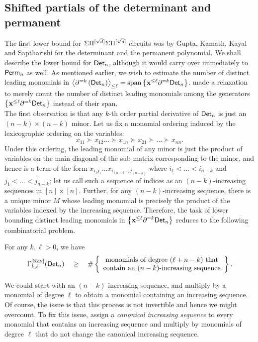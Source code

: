 \subsection{Shifted partials of the determinant and permanent}

The first lower bound for $\Sigma\Pi^{[\sqrt{d}]}\Sigma\Pi^{[\sqrt{d}]}$ circuits was by Gupta, Kamath, Kayal and Saptharishi \cite{gkks13} for the determinant and the permanent polynomial. We shall describe the lower bound for $\mathsf{Det}_n$, although it would carry over immediately to $\mathsf{Perm}_n$ as well. As mentioned earlier, we wish to estimate the number of distinct leading monomials in $\left\langle\partial^{=k}\left(\mathsf{Det}_n\right)\right\rangle_{\leq \ell} = \mathrm{span}\left\{\mathbf{x}^{\leq \ell}\partial^{=k}\mathsf{Det}_n\right\}$. \cite{gkks13} made a relaxation to merely count the number of distinct leading monomials among the generators $\left\{\mathbf{x}^{\leq \ell}\partial^{=k}\mathsf{Det}_n\right\}$ instead of their span. \\

The first observation is that any $k$-th order partial derivative of $\mathsf{Det}_n$ is just an $(n-k)\times (n-k)$ minor. Let us fix a monomial ordering induced by the lexicographic ordering on the variables:
$$
x_{11} \succ x_{12} \dots \succ x_{1n} \succ x_{21} \succ \dots \succ x_{nn}.
$$
Under this ordering, the leading monomial of any minor is just the product of variables on the main diagonal of the sub-matrix corresponding to the minor, and hence is a term of the form $x_{i_1j_1}\dots x_{i_{(n-k)},j_{(n-k)}}$ where $i_1 < \dots < i_{n-k}$ and $j_1 < \dots < j_{n-k}$; let us call such a sequence of indices as an $(n-k)$-increasing sequences in $[n]\times [n]$. Further, for any $(n-k)$-increasing sequence, there is a unique minor $M$ whose leading monomial is precisely the product of the variables indexed by the increasing sequence. Therefore, the task of lower bounding distinct leading monomials in $\left\{\mathbf{x}^{\leq \ell}\partial^{=k}\mathsf{Det}_n\right\}$ reduces to the following combinatorial problem.
\begin{claim} For any $k,\ell > 0$,  we have
$$
\Gamma^{\mathrm{[Kay]}}_{k,\ell}(\mathsf{Det}_n) \quad \geq \quad \#\left\{\begin{array}{cc}\text{monomials of degree $(\ell + n -k)$ that}\\\text{contain an $(n-k)$-increasing sequence}\end{array}\right\}.
$$
\end{claim}

We could start with an $(n-k)$-increasing sequence, and multiply by a monomial of degree $\ell$ to obtain a monomial containing an increasing sequence. Of course, the issue is that this process is not invertible and hence we might overcount. To fix this issue, \cite{gkks13} assign a \emph{canonical increasing sequence} to every monomial that contains an increasing sequence and multiply by monomials of degree $\ell$ that do not change the canonical increasing sequence. 

